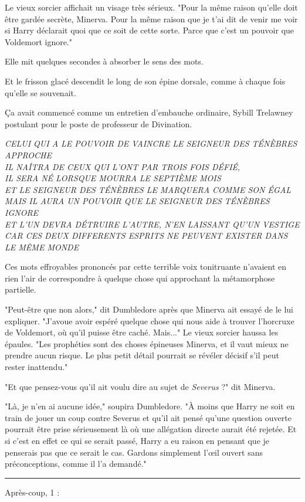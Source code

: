 Le vieux sorcier affichait un visage très sérieux. "Pour la même raison qu'elle doit être gardée secrète, Minerva. Pour la même raison que je t'ai dit de venir me voir si Harry déclarait quoi que ce soit de cette sorte. Parce que c'est un pouvoir que Voldemort ignore."

Elle mit quelques secondes à absorber le sens des mots.

Et le frisson glacé descendit le long de son épine dorsale, comme à chaque fois qu'elle se souvenait.

Ça avait commencé comme un entretien d'embauche ordinaire, Sybill Trelawney postulant pour le poste de professeur de Divination.

\emph{CELUI QUI A LE POUVOIR DE VAINCRE LE SEIGNEUR DES TÉNÈBRES APPROCHE} \\\emph{} \emph{IL NAÎTRA DE CEUX QUI L'ONT PAR TROIS FOIS DÉFIÉ,} \\\emph{} \emph{IL SERA NÉ LORSQUE MOURRA LE SEPTIÈME MOIS} \\\emph{} \emph{ET LE SEIGNEUR DES TÉNÈBRES LE MARQUERA COMME SON ÉGAL} \\\emph{} \emph{MAIS IL AURA UN POUVOIR QUE LE SEIGNEUR DES TÉNÈBRES IGNORE} \\\emph{} \emph{ET L'UN DEVRA DÉTRUIRE L'AUTRE, N'EN LAISSANT QU'UN VESTIGE} \\\emph{} \emph{CAR CES DEUX DIFFERENTS ESPRITS NE PEUVENT EXISTER DANS LE MÊME MONDE} 

Ces mots effroyables prononcés par cette terrible voix tonitruante n'avaient en rien l'air de correspondre à quelque chose qui approchant la métamorphose partielle.

"Peut-être que non alors," dit Dumbledore après que Minerva ait essayé de le lui expliquer. "J'avoue avoir espéré quelque chose qui nous aide à trouver l'horcruxe de Voldemort, où qu'il puisse être caché. Mais..." Le vieux sorcier haussa les épaules. "Les prophéties sont des choses épineuses Minerva, et il vaut mieux ne prendre aucun risque. Le plus petit détail pourrait se révéler décisif s'il peut rester inattendu."

"Et que pensez-vous qu'il ait voulu dire au sujet de \emph{Severus}  ?" dit Minerva.

"Là, je n'en ai aucune idée," soupira Dumbledore. "À moins que Harry ne soit en train de jouer un coup contre Severus et qu'il ait pensé qu'une question ouverte pourrait être prise sérieusement là où une allégation directe aurait été rejetée. Et si c'est en effet ce qui se serait passé, Harry a eu raison en pensant que je penserais pas que ce serait le cas. Gardons simplement l'œil ouvert sans préconceptions, comme il l'a demandé."
\par\noindent\rule{\textwidth}{0.4pt}
Après-coup, 1 :

